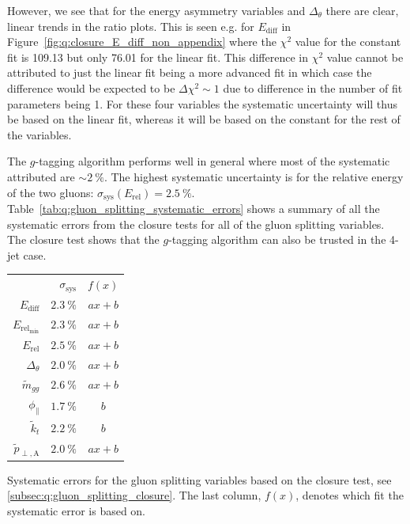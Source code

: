 However, we see that for the energy asymmetry variables and $\Delta_\theta$ there are clear, linear trends in the ratio plots. This is seen e.g. for $E_\mathrm{diff}$ in Figure~\ref{fig:q:closure_E_diff_non_appendix} where the $\chi^2$ value for the constant fit is \num{109.13} but only \num{76.01} for the linear fit. This difference in $\chi^2$ value cannot be attributed to just the linear fit being a more advanced fit in which case the difference would be expected to be $\Delta \chi^2 \sim 1$ due to difference in the number of fit parameters being \num{1}. For these four variables the systematic uncertainty will thus be based on the linear fit, whereas it will be based on the constant for the rest of the variables. 

The $g$-tagging algorithm performs well in general where most of the systematic attributed are ${\sim} \SI{2}{\percent}$. The highest systematic uncertainty is for the relative energy of the two gluons: $\sigma_\mathrm{sys}(E_\mathrm{rel}) = \SI{2.5}{\percent}$. Table~\ref{tab:q:gluon_splitting_systematic_errors} shows a summary of all the systematic errors from the closure tests for all of the gluon splitting variables. The closure test shows that the $g$-tagging algorithm can also be trusted in the 4-jet case. 

\begin{margintable}[6mm]
  \centerfloat
  \begin{tabular}{@{}rrc@{}}
  {}                                                & $\sigma_\mathrm{sys}$& $f(x)$ \\ \addlinespace[0.1em] \midrule \addlinespace[0.2em]
  $E_\mathrm{diff}$                                 & $\SI{2.3}{\percent}$ & $ax+b$ \\ \addlinespace[0.2em]
  $E_{\mathrm{rel}_\mathrm{min}}$                   & $\SI{2.3}{\percent}$ & $ax+b$  \\\addlinespace[0.2em]
  $E_\mathrm{rel}$                                  & $\SI{2.5}{\percent}$ & $ax+b$  \\\addlinespace[0.2em]
  $\Delta_\theta$                                   & $\SI{2.0}{\percent}$ & $ax+b$  \\\addlinespace[0.2em]
  $\tilde{m}_{gg}$                                  & $\SI{2.6}{\percent}$ & $ax+b$ \\\addlinespace[0.2em]
  $\phi_\mathrm{\parallel}$                         & $\SI{1.7}{\percent}$ & $b$  \\\addlinespace[0.2em]
  $\tilde{k}_t$                                     & $\SI{2.2}{\percent}$ & $b$ \\\addlinespace[0.2em]
  $\tilde{p}_{\perp,\mathrm{A}}$                    & $\SI{2.0}{\percent}$ & $ax+b$  \\ %
  \end{tabular}
  \vspace{1mm}
  \caption[Gluon Splitting Systematic Errors]{\label{tab:q:gluon_splitting_systematic_errors}Systematic errors for the gluon splitting variables based on the closure test, see \autoref{subsec:q:gluon_splitting_closure}.  The last column, $f(x)$, denotes which fit the systematic error is based on.}
\end{margintable}

